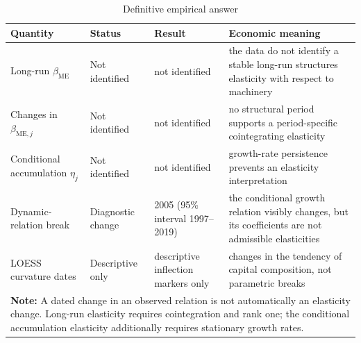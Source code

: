 \begin{table}[h!]
\centering\small
\caption{Definitive empirical answer}
\label{tab:definitive-answer}
\begin{tabular}{p{2.4cm}p{2.5cm}p{2.7cm}p{4.9cm}}
\toprule
\textbf{Quantity} & \textbf{Status} & \textbf{Result} & \textbf{Economic meaning}\\
\midrule
Long-run $\beta_{\mathrm{ME}}$ & Not identified & not identified & the data do not identify a stable long-run structures elasticity with respect to machinery \\
Changes in $\beta_{\mathrm{ME},j}$ & Not identified & not identified & no structural period supports a period-specific cointegrating elasticity \\
Conditional accumulation $\eta_j$ & Not identified & not identified & growth-rate persistence prevents an elasticity interpretation \\
Dynamic-relation break & Diagnostic change & 2005 (95\% interval 1997--2019) & the conditional growth relation visibly changes, but its coefficients are not admissible elasticities \\
LOESS curvature dates & Descriptive only & descriptive inflection markers only & changes in the tendency of capital composition, not parametric breaks \\
\bottomrule
\multicolumn{4}{p{13.1cm}}{\footnotesize \textbf{Note:} A dated change in an observed relation is not automatically an elasticity change. Long-run elasticity requires cointegration and rank one; the conditional accumulation elasticity additionally requires stationary growth rates.}
\end{tabular}
\end{table}

